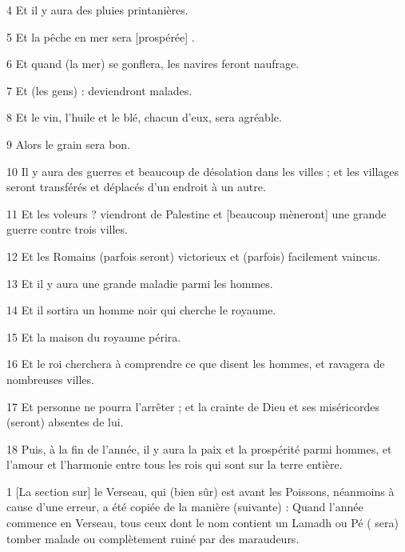 \par 4 Et il y aura des pluies printanières.

\par 5 Et la pêche en mer sera [prospérée] .

\par 6 Et quand (la mer) se gonflera, les navires feront naufrage.

\par 7 Et (les gens) : deviendront malades.

\par 8 Et le vin, l'huile et le blé, chacun d'eux, sera agréable.

\par 9 Alors le grain sera bon.

\par 10 Il y aura des guerres et beaucoup de désolation dans les villes ; et les villages seront transférés et déplacés d'un endroit à un autre.

\par 11 Et les voleurs ? viendront de Palestine et [beaucoup mèneront] une grande guerre contre trois villes.

\par 12 Et les Romains (parfois seront) victorieux et (parfois) facilement vaincus.

\par 13 Et il y aura une grande maladie parmi les hommes.

\par 14 Et il sortira un homme noir qui cherche le royaume.

\par 15 Et la maison du royaume périra.

\par 16 Et le roi cherchera à comprendre ce que disent les hommes, et ravagera de nombreuses villes.

\par 17 Et personne ne pourra l'arrêter ; et la crainte de Dieu et ses miséricordes (seront) absentes de lui.

\par 18 Puis, à la fin de l'année, il y aura la paix et la prospérité parmi hommes, et l'amour et l'harmonie entre tous les rois qui sont sur la terre entière.


\par 1 [La section sur] le Verseau, qui (bien sûr) est avant les Poissons, néanmoins à cause d'une erreur, a été copiée de la manière (suivante) : Quand l'année commence en Verseau, tous ceux dont le nom contient un Lamadh ou Pé ( sera) tomber malade ou complètement ruiné par des maraudeurs.

